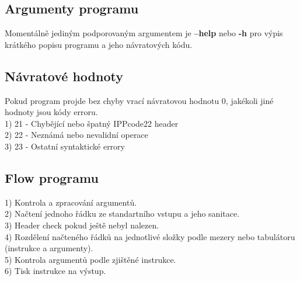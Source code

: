 \subsection{Argumenty programu}

Momentálně jediným podporovaným argumentem je \textbf{--help} nebo \textbf{-h} pro výpis krátkého popisu programu a jeho návratových kódu.


\subsection{Návratové hodnoty}

Pokud program projde bez chyby vrací návratovou hodnotu 0, jakékoli jiné hodnoty jsou kódy erroru.\\
1) 21 - Chybějící nebo špatný IPPcode22 header \\
2) 22 - Neznámá nebo nevalidní operace \\
3) 23 - Ostatní syntaktické errory


\subsection{Flow programu}

1) Kontrola a zpracování argumentů. \\
2) Načtení jednoho řádku ze standartního vstupu a jeho sanitace. \\
3) Header check pokud ještě nebyl nalezen. \\
4) Rozdělení načteného řádků na jednotlivé složky podle mezery nebo tabulátoru (instrukce a argumenty). \\
5) Kontrola argumentů podle zjištěné instrukce. \\
6) Tisk instrukce na výstup. \\
